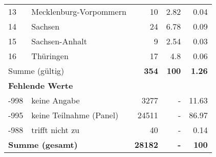 \begin{longtable}{lXrrr}
     13 &
     \multicolumn{1}{X}{ Mecklenburg-Vorpommern   } &


       \num{10} &
       \num[round-mode=places,round-precision=2]{2.82} &
         \num[round-mode=places,round-precision=2]{0.04} \\

     14 &
     \multicolumn{1}{X}{ Sachsen   } &


       \num{24} &
       \num[round-mode=places,round-precision=2]{6.78} &
         \num[round-mode=places,round-precision=2]{0.09} \\

     15 &
     \multicolumn{1}{X}{ Sachsen-Anhalt   } &


       \num{9} &
       \num[round-mode=places,round-precision=2]{2.54} &
         \num[round-mode=places,round-precision=2]{0.03} \\

     16 &
     \multicolumn{1}{X}{ Thüringen   } &


       \num{17} &
       \num[round-mode=places,round-precision=2]{4.8} &
         \num[round-mode=places,round-precision=2]{0.06} \\
     \midrule
     \multicolumn{2}{l}{Summe (gültig)} &
       \textbf{\num{354}} &
     \textbf{\num{100}} &
       \textbf{\num[round-mode=places,round-precision=2]{1.26}} \\
     \multicolumn{5}{l}{\textbf{Fehlende Werte}}\\
       -998 &
       keine Angabe &
         \num{3277} &
        - &
         \num[round-mode=places,round-precision=2]{11.63} \\
       -995 &
       keine Teilnahme (Panel) &
         \num{24511} &
        - &
         \num[round-mode=places,round-precision=2]{86.97} \\
       -988 &
       trifft nicht zu &
         \num{40} &
        - &
         \num[round-mode=places,round-precision=2]{0.14} \\
     \midrule
     \multicolumn{2}{l}{\textbf{Summe (gesamt)}} &
          \textbf{\num{28182}} &
        \textbf{-} &
        \textbf{\num{100}} \\
     \bottomrule
     \end{longtable}
     
